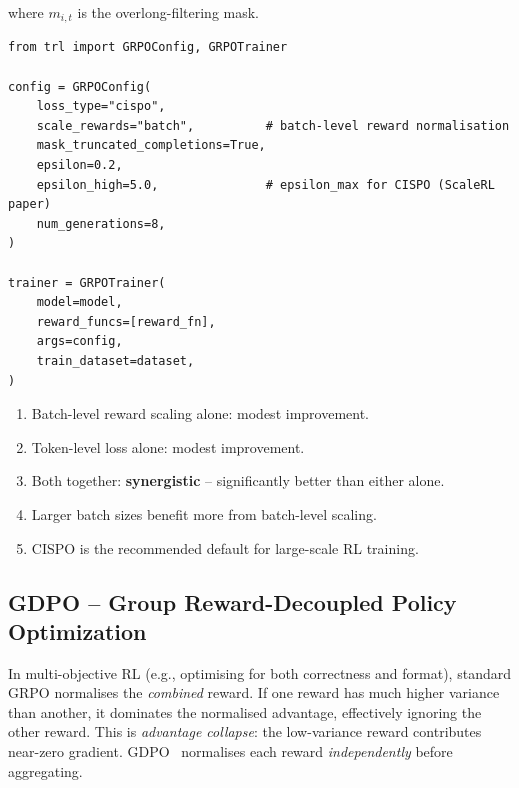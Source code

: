 where $m_{i,t}$ is the overlong-filtering mask.

\begin{examplebox}
\begin{lstlisting}[style=pythonstyle]
from trl import GRPOConfig, GRPOTrainer

config = GRPOConfig(
    loss_type="cispo",
    scale_rewards="batch",          # batch-level reward normalisation
    mask_truncated_completions=True,
    epsilon=0.2,
    epsilon_high=5.0,               # epsilon_max for CISPO (ScaleRL paper)
    num_generations=8,
)

trainer = GRPOTrainer(
    model=model,
    reward_funcs=[reward_fn],
    args=config,
    train_dataset=dataset,
)
\end{lstlisting}
\end{examplebox}

\begin{keybox}
\begin{enumerate}
  \item Batch-level reward scaling alone: modest improvement.
  \item Token-level loss alone: modest improvement.
  \item Both together: \textbf{synergistic} -- significantly better than either alone.
  \item Larger batch sizes benefit more from batch-level scaling.
  \item CISPO is the recommended default for large-scale RL training.
\end{enumerate}
\end{keybox}

\subsection{GDPO -- Group Reward-Decoupled Policy Optimization}
\label{sec:gdpo}

\begin{intuitionbox}
In multi-objective RL (e.g., optimising for both correctness and format), standard GRPO normalises the \emph{combined} reward. If one reward has much higher variance than another, it dominates the normalised advantage, effectively ignoring the other reward. This is \emph{advantage collapse}: the low-variance reward contributes near-zero gradient. GDPO~\cite{zhong2025gdpo} normalises each reward \emph{independently} before aggregating.
\end{intuitionbox}

